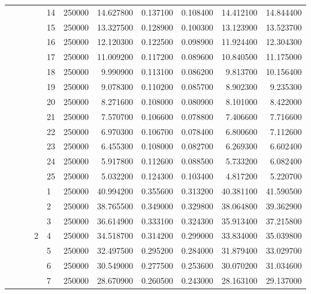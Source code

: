 \begin{tabular}{llllllrrrrr}
\cline{5-11}
 &  &  &  & 14 & 250000 & 14.627800 & 0.137100 & 0.108400 & 14.412100 & 14.844400 \\
\cline{5-11}
 &  &  &  & 15 & 250000 & 13.327500 & 0.128900 & 0.100300 & 13.123900 & 13.523700 \\
\cline{5-11}
 &  &  &  & 16 & 250000 & 12.120300 & 0.122500 & 0.098900 & 11.924400 & 12.304300 \\
\cline{5-11}
 &  &  &  & 17 & 250000 & 11.009200 & 0.117200 & 0.089600 & 10.840500 & 11.175000 \\
\cline{5-11}
 &  &  &  & 18 & 250000 & 9.990900 & 0.113100 & 0.086200 & 9.813700 & 10.156400 \\
\cline{5-11}
 &  &  &  & 19 & 250000 & 9.078300 & 0.110200 & 0.085700 & 8.902300 & 9.235300 \\
\cline{5-11}
 &  &  &  & 20 & 250000 & 8.271600 & 0.108000 & 0.080900 & 8.101000 & 8.422000 \\
\cline{5-11}
 &  &  &  & 21 & 250000 & 7.570700 & 0.106600 & 0.078800 & 7.406600 & 7.716600 \\
\cline{5-11}
 &  &  &  & 22 & 250000 & 6.970300 & 0.106700 & 0.078400 & 6.800600 & 7.112600 \\
\cline{5-11}
 &  &  &  & 23 & 250000 & 6.455300 & 0.108000 & 0.082700 & 6.269300 & 6.602400 \\
\cline{5-11}
 &  &  &  & 24 & 250000 & 5.917800 & 0.112600 & 0.088500 & 5.733200 & 6.082400 \\
\cline{5-11}
 &  &  &  & 25 & 250000 & 5.032200 & 0.124300 & 0.103400 & 4.817200 & 5.220700 \\
\cline{4-11} \cline{5-11}
 &  &  & \multirow[t]{25}{*}{2} & 1 & 250000 & 40.994200 & 0.355600 & 0.313200 & 40.381100 & 41.590500 \\
\cline{5-11}
 &  &  &  & 2 & 250000 & 38.765500 & 0.349000 & 0.329800 & 38.064800 & 39.362900 \\
\cline{5-11}
 &  &  &  & 3 & 250000 & 36.614900 & 0.333100 & 0.324300 & 35.913400 & 37.215800 \\
\cline{5-11}
 &  &  &  & 4 & 250000 & 34.518700 & 0.314200 & 0.299000 & 33.834000 & 35.039800 \\
\cline{5-11}
 &  &  &  & 5 & 250000 & 32.497500 & 0.295200 & 0.284000 & 31.879400 & 33.029700 \\
\cline{5-11}
 &  &  &  & 6 & 250000 & 30.549000 & 0.277500 & 0.253600 & 30.070200 & 31.034600 \\
\cline{5-11}
 &  &  &  & 7 & 250000 & 28.670900 & 0.260500 & 0.243000 & 28.163100 & 29.137000 \\

\end{tabular}

